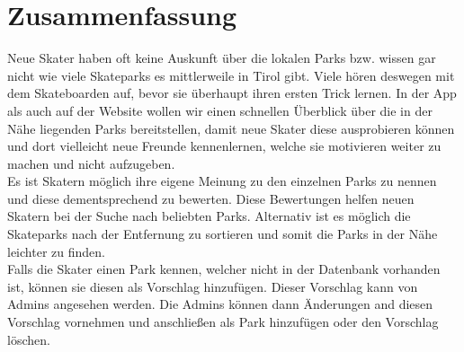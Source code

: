 \section*{Zusammenfassung}

Neue Skater haben oft keine Auskunft über die lokalen Parks bzw. wissen gar nicht wie viele
Skateparks es mittlerweile in Tirol gibt. Viele hören deswegen mit dem Skateboarden auf, bevor sie 
überhaupt ihren ersten Trick lernen. In der App als auch auf der Website wollen wir einen 
schnellen Überblick über die in der Nähe liegenden Parks bereitstellen, damit neue Skater diese
ausprobieren können und dort vielleicht neue Freunde kennenlernen, welche sie motivieren weiter zu 
machen und nicht aufzugeben.\\


Es ist Skatern möglich ihre eigene Meinung zu den einzelnen Parks zu nennen und diese dementsprechend 
zu bewerten. Diese Bewertungen helfen neuen Skatern bei der Suche nach beliebten Parks. 
Alternativ ist es möglich die Skateparks nach der Entfernung zu sortieren und somit die Parks in 
der Nähe leichter zu finden. \\


Falls die Skater einen Park kennen, welcher nicht in der Datenbank vorhanden ist, können 
sie diesen als Vorschlag hinzufügen. Dieser Vorschlag kann von Admins angesehen werden. Die Admins 
können dann Änderungen and diesen Vorschlag vornehmen und anschließen als Park hinzufügen oder den
Vorschlag löschen.\\
\newpage